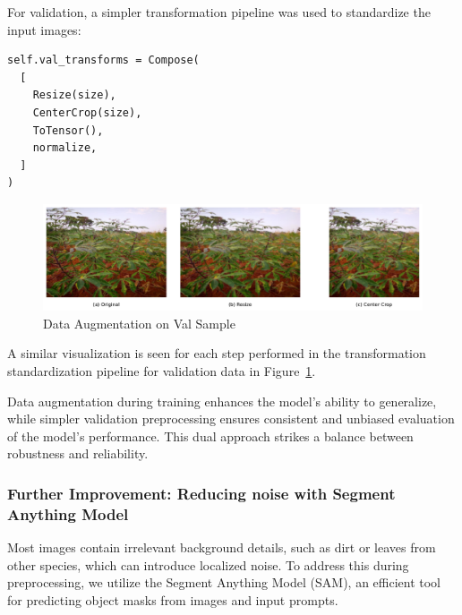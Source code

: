 For validation, a simpler transformation pipeline was used to standardize the input images:

\begin{lstlisting}
self.val_transforms = Compose(
  [
    Resize(size),
    CenterCrop(size),
    ToTensor(),
    normalize,
  ]
)
\end{lstlisting}

\begin{figure}[t]
    \centering
    \includegraphics[width=\linewidth]{graphs/overview/ValidationTransform.pdf}
    \caption{Data Augmentation on Val Sample}
    \label{fig:ValDataAug}
\end{figure}

A similar visualization is seen for each step performed in the transformation standardization pipeline for validation data in Figure~\ref{fig:ValDataAug}.

Data augmentation during training enhances the model's ability to generalize, while simpler validation preprocessing ensures consistent and unbiased evaluation of the model's performance. This dual approach strikes a balance between robustness and reliability.

\subsubsection{Further Improvement: Reducing noise with Segment Anything Model}

Most images contain irrelevant background details, such as dirt or leaves from other species, which can introduce localized noise. To address this during preprocessing, we utilize the Segment Anything Model (SAM), an efficient tool for predicting object masks from images and input prompts.

